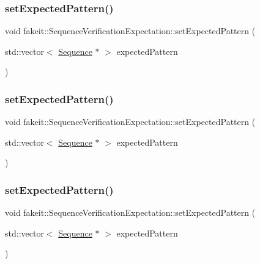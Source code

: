 \subsubsection{\texorpdfstring{setExpectedPattern()}{setExpectedPattern()}\hspace{0.1cm}{\footnotesize\ttfamily [5/9]}}
{\footnotesize\ttfamily void fakeit\+::\+Sequence\+Verification\+Expectation\+::set\+Expected\+Pattern (\begin{DoxyParamCaption}\item[{std\+::vector$<$ \mbox{\hyperlink{classfakeit_1_1Sequence}{Sequence}} $\ast$ $>$}]{expected\+Pattern }\end{DoxyParamCaption})\hspace{0.3cm}{\ttfamily [inline]}}

\mbox{\label{structfakeit_1_1SequenceVerificationExpectation_acf31012cd30a4213e3fb927549525c7d}} 
\subsubsection{\texorpdfstring{setExpectedPattern()}{setExpectedPattern()}\hspace{0.1cm}{\footnotesize\ttfamily [6/9]}}
{\footnotesize\ttfamily void fakeit\+::\+Sequence\+Verification\+Expectation\+::set\+Expected\+Pattern (\begin{DoxyParamCaption}\item[{std\+::vector$<$ \mbox{\hyperlink{classfakeit_1_1Sequence}{Sequence}} $\ast$ $>$}]{expected\+Pattern }\end{DoxyParamCaption})\hspace{0.3cm}{\ttfamily [inline]}}

\mbox{\label{structfakeit_1_1SequenceVerificationExpectation_acf31012cd30a4213e3fb927549525c7d}} 
\subsubsection{\texorpdfstring{setExpectedPattern()}{setExpectedPattern()}\hspace{0.1cm}{\footnotesize\ttfamily [7/9]}}
{\footnotesize\ttfamily void fakeit\+::\+Sequence\+Verification\+Expectation\+::set\+Expected\+Pattern (\begin{DoxyParamCaption}\item[{std\+::vector$<$ \mbox{\hyperlink{classfakeit_1_1Sequence}{Sequence}} $\ast$ $>$}]{expected\+Pattern }\end{DoxyParamCaption})\hspace{0.3cm}{\ttfamily [inline]}}

